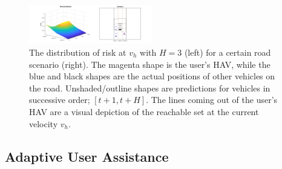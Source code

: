 \documentclass[letterpaper, 10 pt, conference]{ieeeconf}  %
\newcommand\NB[1]{$\spadesuit$\footnote{NB: #1}}
\begin{document}
\begin{figure}[ht]
    \includegraphics[width=0.48\textwidth]{fig/assist.png}
    \caption{The distribution of risk at $v_h$ with $H = 3$ (left) for a certain road scenario (right). The magenta shape is the user's HAV, while the blue and black shapes are the actual positions of other vehicles on the road. Unshaded/outline shapes are predictions for vehicles in successive order; $[t+1,t+H]$. The lines coming out of the user's HAV are a visual depiction of the reachable set at the current velocity $v_h$.}
    \label{fig:riskd}
\end{figure}




\subsection{Adaptive User Assistance}

\end{document}
